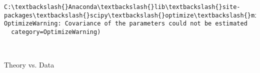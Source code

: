 \documentclass[11pt]{article}
\begin{document}
    \begin{Verbatim}[commandchars=\\\{\}]
C:\textbackslash{}Anaconda\textbackslash{}lib\textbackslash{}site-packages\textbackslash{}scipy\textbackslash{}optimize\textbackslash{}minpack.py:794: OptimizeWarning: Covariance of the parameters could not be estimated
  category=OptimizeWarning)

    \end{Verbatim}

    \begin{center}
    \end{center}
    { \hspace*{\fill} \\}
    
    Theory vs. Data
\end{document}
